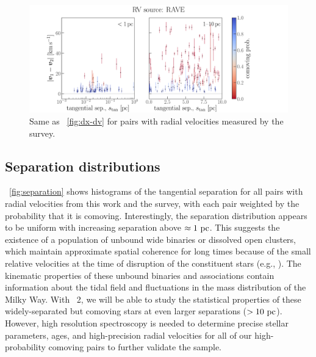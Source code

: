 \documentclass[modern, letterpaper]{aastex61}
\newcommand{\gaia}{\project{Gaia}}
\newcommand{\DR}[1]{\acronym{DR}#1}
\begin{document}
\begin{figure}[htb]
  \begin{center}
    \includegraphics[width=0.9\linewidth]{dx-dv-rave.pdf}
  \end{center}
  \caption{%
    Same as \figurename~\ref{fig:dx-dv} for pairs with radial velocities
    measured by the  survey.
    \label{fig:dx-dv-rave}}
\end{figure}

\subsection{Separation distributions}\label{sec:separations}

\figurename~\ref{fig:separation} shows histograms of the tangential separation
for all pairs with radial velocities from this work and the 
survey, with each pair weighted by the probability that it is comoving.
Interestingly, the separation distribution appears to be uniform with increasing
separation above $\approx1~\mathrm{pc}$.
This suggests the existence of a population of unbound wide binaries or
dissolved open clusters, which maintain approximate spatial coherence for long
times because of the small relative velocities at the time of disruption of the
constituent stars (e.g., \citealt{Jiang:2010}).
The kinematic properties of these unbound binaries and associations contain
information about the tidal field and fluctuations in the mass distribution of
the Milky Way.
With \gaia\ \DR{2}, we will be able to study the statistical properties of these
widely-separated but comoving stars at even larger separations ($>10~\mathrm{pc}$).
However, high resolution spectroscopy is needed to determine precise stellar
parameters, ages, and high-precision radial velocities for all of our
high-probability comoving pairs to further validate the sample.
\end{document}
